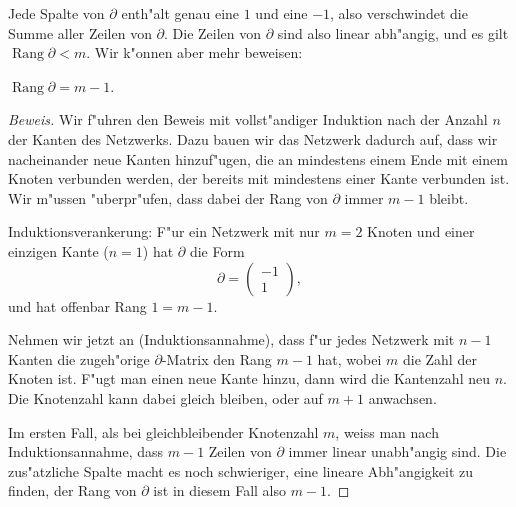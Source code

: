 Jede Spalte von $\partial$ enth"alt genau eine $1$ und eine $-1$, also
verschwindet die Summe aller Zeilen von $\partial$.
Die Zeilen von $\partial$ sind also linear abh"angig, und es
gilt $\operatorname{Rang}\partial < m$. Wir k"onnen aber mehr
beweisen:

\begin{satz} $\operatorname{Rang}\partial = m-1$.
\label{partialrank}
\end{satz}

\begin{proof}[Beweis]
Wir f"uhren den Beweis mit vollst"andiger Induktion nach der Anzahl $n$
der Kanten des Netzwerks.
Dazu bauen wir das Netzwerk dadurch auf, dass wir nacheinander neue 
Kanten hinzuf"ugen, die an mindestens einem Ende mit einem Knoten
verbunden werden, der bereits mit mindestens einer Kante verbunden
ist. Wir m"ussen "uberpr"ufen, dass dabei der Rang von $\partial$
immer $m-1$ bleibt.

Induktionsverankerung: F"ur ein Netzwerk mit nur $m=2$ Knoten und
einer einzigen Kante ($n=1$) hat
$\partial$ die Form
\[
\partial=\begin{pmatrix}-1\\1\end{pmatrix},
\]
und hat offenbar Rang $1=m-1$. 

Nehmen wir jetzt an (Induktionsannahme), dass f"ur jedes Netzwerk mit $n-1$
Kanten die zugeh"orige $\partial$-Matrix den Rang $m-1$ hat,
wobei $m$ die Zahl der Knoten ist.
F"ugt man einen neue Kante hinzu, dann wird die Kantenzahl neu $n$.
Die Knotenzahl kann dabei gleich bleiben, oder auf $m+1$ anwachsen.

Im ersten Fall, als bei gleichbleibender Knotenzahl $m$,
weiss man nach Induktionsannahme, dass $m-1$ Zeilen
von $\partial$ immer linear unabh"angig sind.
Die zus"atzliche Spalte macht es noch schwieriger, eine lineare
Abh"angigkeit zu finden, der Rang von $\partial$ ist in diesem
Fall also $m-1$.


\end{proof}
